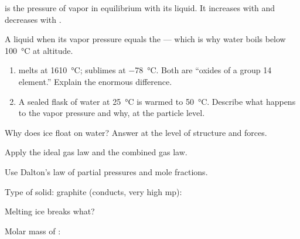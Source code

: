 \documentclass{apchem-notes}
\begin{document}
 is the pressure of vapor in equilibrium with its
liquid. It increases with  and decreases
with .

A liquid  when its vapor pressure equals the
 --- which is why water boils below
\SI{100}{\celsius} at altitude.


\begin{enumerate}[leftmargin=*,itemsep=0.4em]
  \item {} melts at \SI{1610}{\celsius};  sublimes at
        \SI{-78}{\celsius}. Both are ``oxides of a group 14 element.''
        Explain the enormous difference.
  \item A sealed flask of water at \SI{25}{\celsius} is warmed to
        \SI{50}{\celsius}. Describe what happens to the vapor pressure and
        why, at the particle level. 
\end{enumerate}

\begin{exitticket}
Why does ice float on water? Answer at the level of structure and forces.
\end{exitticket}


\begin{objectives}
  \item Apply the ideal gas law and the combined gas law.
  \item Use Dalton's law of partial pressures and mole fractions.
\end{objectives}


\begin{warmup}[3]
  \item Type of solid: graphite (conducts, very high mp):
  \item Melting ice breaks what?
  \item Molar mass of : 
\end{warmup}
\end{document}

